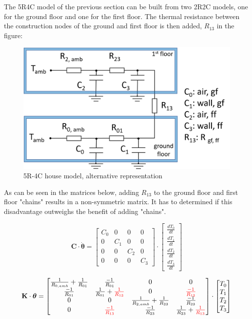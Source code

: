 The 5R4C model of the previous section can be built from two 2R2C models, one for the ground floor and one for the first floor. The thermal resistance between the construction nodes of the ground and first floor is then added, $R_{13}$ in the figure:
 
\begin{figure}[H]
	\centering
	\includegraphics[width=0.6\columnwidth]{Pictures/5R4C_alternative.png}
	\caption[Short title]{5R-4C house model, alternative representation}
	\label{fig:alt5R4C}
\end{figure}

As can be seen in the matrices below, adding $R_{13}$ to the ground floor and first floor "chains" results in a non-symmetric matrix. It has to determined if this disadvantage outweighs the benefit of adding "chains".

\begin{equation}
	\mathbf{C} \cdot \boldsymbol{\dot{\theta}} =
	\begin{bmatrix}
		C_{0} & 0 & 0 & 0\\
		0 &  C_{1} & 0 & 0 \\
		0 & 0 & C_{2} & 0\\
		0 & 0 & 0 & C_{3}
	\end{bmatrix}
	\cdot
	\begin{bmatrix}
		\frac{dT_{0}}{dt} \\
		\frac{dT_{1}}{dt} \\
		\frac{dT_{2}}{dt} \\
		\frac{dT_{3}}{dt} 
	\end{bmatrix}
\end{equation}

\begin{equation}
	\mathbf{K} \cdot \boldsymbol{\theta} =
	\begin{bmatrix}
		\frac{1}{R_{0, amb}} + \frac{1}{R_{01}} & \frac{-1}{R_{01}} & 0 & 0 \\
		\frac{-1}{R_{01}} &  \frac{1}{R_{01}} + \color{red} \frac{1}{R_{13}} & 0 & \color{red} \frac{-1}{R_{13}} \\
		0 & 0 & \frac{1}{R_{2, amb}} + \frac{1}{R_{23}} & \frac{-1}{R_{23}} \\
		0 & \color{red}\frac{-1}{R_{13}} & \frac{-1}{R_{23}}  & \frac{1}{R_{23}} + \color{red}\frac{1}{R_{13}}
	\end{bmatrix}
	\cdot
	\begin{bmatrix}
		T_{0} \\
		T_{1} \\
		T_{2} \\
		T_{3}
	\end{bmatrix}
\end{equation}

